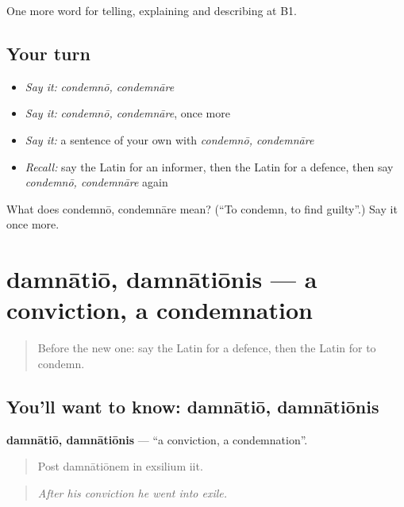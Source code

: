 \begin{grammarlens}[title={What you've built}]
One more word for telling, explaining and describing at B1.
\end{grammarlens}

\subsection*{Your turn}
\begin{itemize}
\raggedright
  \item \emph{Say it:} \emph{condemnō, condemnāre}
  \item \emph{Say it:} \emph{condemnō, condemnāre}, once more
  \item \emph{Say it:} a sentence of your own with \emph{condemnō, condemnāre}
  \item \emph{Recall:} say the Latin for an informer, then the Latin for a defence, then say \emph{condemnō, condemnāre} again
\end{itemize}

\begin{tcolorbox}[breakable,colback=teal!4,colframe=teal!35!black,title={Before you move on}]
What does condemnō, condemnāre mean? (\textquotedblleft{}To condemn, to find guilty\textquotedblright{}.) Say it once more.
\end{tcolorbox}
\section[damnātiō, damnātiōnis]{damnātiō, damnātiōnis — a conviction, a condemnation}

\label{lesson:LA-C413-damnatio}



\begin{quote}
Before the new one: say the Latin for a defence, then the Latin for to condemn.
\end{quote}

\subsection*{You'll want to know: damnātiō, damnātiōnis}
\textbf{damnātiō, damnātiōnis} — \textquotedblleft{}a conviction, a condemnation\textquotedblright{}.

\begin{quote}
Post damnātiōnem in exsilium iit.
\end{quote}

\begin{quote}
\emph{After his conviction he went into exile.}
\end{quote}

